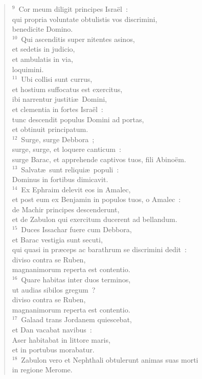 \begin{flushleft}\begin{verse}${}^{9}$~Cor meum diligit principes Isra\"el~:\\ qui propria voluntate obtulistis vos discrimini,\\ benedicite Domino.\\
${}^{10}$~Qui ascenditis super nitentes asinos,\\ et sedetis in judicio,\\ et ambulatis in via,\\ loquimini.\\
${}^{11}$~Ubi collisi sunt currus,\\ et hostium suffocatus est exercitus,\\ ibi narrentur justiti\ae\ Domini,\\ et clementia in fortes Isra\"el~:\\ tunc descendit populus Domini ad portas,\\ et obtinuit principatum.\\
${}^{12}$~Surge, surge Debbora~;\\ surge, surge, et loquere canticum~:\\ surge Barac, et apprehende captivos tuos, fili Abino\"em.\\
${}^{13}$~Salvat\ae\ sunt reliqui\ae\ populi~:\\ Dominus in fortibus dimicavit.\\
${}^{14}$~Ex Ephraim delevit eos in Amalec,\\ et post eum ex Benjamin in populos tuos, o Amalec~:\\ de Machir principes descenderunt,\\ et de Zabulon qui exercitum ducerent ad bellandum.\\
${}^{15}$~Duces Issachar fuere cum Debbora,\\ et Barac vestigia sunt secuti,\\ qui quasi in pr\ae ceps ac barathrum se discrimini dedit~:\\ diviso contra se Ruben,\\ magnanimorum reperta est contentio.\\
${}^{16}$~Quare habitas inter duos terminos,\\ ut audias sibilos gregum~?\\ diviso contra se Ruben,\\ magnanimorum reperta est contentio.\\
${}^{17}$~Galaad trans Jordanem quiescebat,\\ et Dan vacabat navibus~:\\ Aser habitabat in littore maris,\\ et in portubus morabatur.\\
${}^{18}$~Zabulon vero et Nephthali obtulerunt animas suas morti\\ in regione Merome.\end{verse}\end{flushleft}


